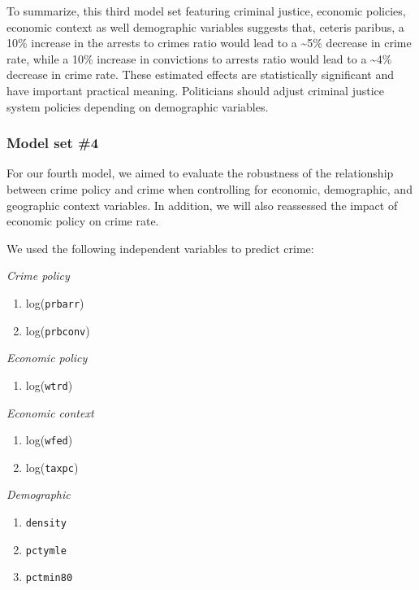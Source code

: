 \documentclass[]{article}
\providecommand{\tightlist}{%
  \setlength{\itemsep}{0pt}\setlength{\parskip}{0pt}}
\begin{document}
To summarize, this third model set featuring criminal justice, economic
policies, economic context as well demographic variables suggests that,
ceteris paribus, a 10\% increase in the arrests to crimes ratio would
lead to a \textasciitilde{}5\% decrease in crime rate, while a 10\%
increase in convictions to arrests ratio would lead to a
\textasciitilde{}4\% decrease in crime rate. These estimated effects are
statistically significant and have important practical meaning.
Politicians should adjust criminal justice system policies depending on
demographic variables.

\hypertarget{model-set-4}{%
\subsubsection{Model set \#4}\label{model-set-4}}

For our fourth model, we aimed to evaluate the robustness of the
relationship between crime policy and crime when controlling for
economic, demographic, and geographic context variables. In addition, we
will also reassessed the impact of economic policy on crime rate.

We used the following independent variables to predict crime:

\emph{Crime policy}

\begin{enumerate}
\def\labelenumi{(\arabic{enumi})}
\item
  log(\texttt{prbarr})
\item
  log(\texttt{prbconv})
\end{enumerate}

\emph{Economic policy}

\begin{enumerate}
\def\labelenumi{(\arabic{enumi})}
\setcounter{enumi}{2}
\tightlist
\item
  log(\texttt{wtrd})
\end{enumerate}

\emph{Economic context}

\begin{enumerate}
\def\labelenumi{(\arabic{enumi})}
\setcounter{enumi}{3}
\item
  log(\texttt{wfed})
\item
  log(\texttt{taxpc})
\end{enumerate}

\emph{Demographic}

\begin{enumerate}
\def\labelenumi{(\arabic{enumi})}
\setcounter{enumi}{5}
\item
  \texttt{density}
\item
  \texttt{pctymle}
\item
  \texttt{pctmin80}
\end{enumerate}
\end{document}

